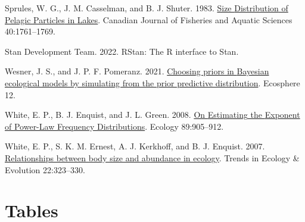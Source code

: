 \documentclass[
  12pt,
]{article}
\newlength{\cslhangindent}
\newlength{\cslentryspacingunit} %
\newenvironment{CSLReferences}[2] %
 {%
  \setlength{\parindent}{0pt}
  \ifodd #1
  \let\oldpar\par
  \def\par{\hangindent=\cslhangindent\oldpar}
  \fi
  \setlength{\parskip}{#2\cslentryspacingunit}
 }%
 {}
\numberwithin{equation}
\begin{document}
\begin{CSLReferences}{1}{0}
\leavevmode{}%
Sprules, W. G., J. M. Casselman, and B. J. Shuter. 1983.
\href{https://doi.org/10.1139/f83-205}{Size {Distribution} of {Pelagic
Particles} in {Lakes}}. Canadian Journal of Fisheries and Aquatic
Sciences 40:1761--1769.

\leavevmode{}%
Stan Development Team. 2022. {RStan}: The {R} interface to {Stan}.

\leavevmode{}%
Wesner, J. S., and J. P. F. Pomeranz. 2021.
\href{https://doi.org/10.1002/ecs2.3739}{Choosing priors in {Bayesian}
ecological models by simulating from the prior predictive distribution}.
Ecosphere 12.

\leavevmode{}%
White, E. P., B. J. Enquist, and J. L. Green. 2008.
\href{https://doi.org/10.1890/07-1288.1}{On {Estimating} the {Exponent}
of {Power-Law Frequency Distributions}}. Ecology 89:905--912.

\leavevmode{}%
White, E. P., S. K. M. Ernest, A. J. Kerkhoff, and B. J. Enquist. 2007.
\href{https://doi.org/10.1016/j.tree.2007.03.007}{Relationships between
body size and abundance in ecology}. Trends in Ecology \& Evolution
22:323--330.

\end{CSLReferences}

\newpage

\hypertarget{tables}{%
\section{Tables}\label{tables}}
\end{document}
